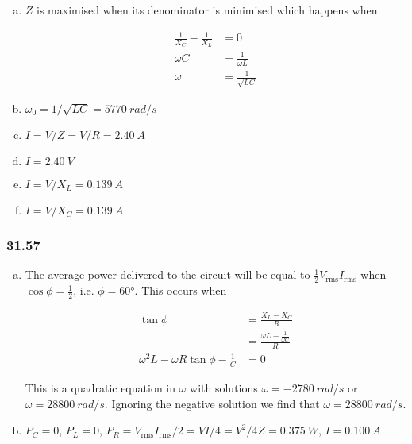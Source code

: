 \documentclass{article}
\begin{document}
\begin{enumerate}[(a)]
  \item $Z$ is maximised when its denominator is minimised which happens when

        \begin{align*}
          \frac{1}{X_C} - \frac{1}{X_L} & = 0                    \\
          \omega C                      & = \frac{1}{\omega L}   \\
          \omega                        & = \frac{1}{\sqrt{L C}}
        \end{align*}

  \item $\omega_0 = 1 / \sqrt{L C} = \qty{5770}{rad/s}$

  \item $I = V / Z = V / R = \qty{2.40}{A}$

  \item $I = \qty{2.40}{V}$

  \item $I = V / X_L = \qty{0.139}{A}$

  \item $I = V / X_C = \qty{0.139}{A}$
\end{enumerate}

\subsubsection{31.57}

\begin{enumerate}[(a)]
  \item The average power delivered to the circuit will be equal to $\frac{1}{2} V_\text{rms} I_\text{rms}$ when $\cos \phi = \frac{1}{2}$, i.e. $\phi = \ang{60}$. This occurs when

        \begin{align*}
          \tan \phi                                     & = \frac{X_L - X_C}{R}                     \\
                                                        & = \frac{\omega L - \frac{1}{\omega C}}{R} \\
          \omega^2 L - \omega R \tan \phi - \frac{1}{C} & = 0
        \end{align*}

        This is a quadratic equation in $\omega$ with solutions $\omega = \qty{-2780}{rad/s}$ or $\omega = \qty{28800}{rad/s}$. Ignoring the negative solution we find that $\omega = \qty{28800}{rad/s}$.

  \item $P_C = 0$, $P_L = 0$, $P_R = V_\text{rms} I_\text{rms} / 2 = V I / 4 = V^2 / 4 Z = \qty{0.375}{W}$, $I = \qty{0.100}{A}$
\end{enumerate}
\end{document}
